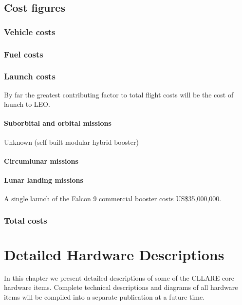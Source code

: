 \documentclass{report}
\begin{document}
\section{Cost figures}

\subsection{Vehicle costs}

\subsection{Fuel costs}

\subsection{Launch costs}

By far the greatest contributing factor to total flight costs will be the cost of launch to LEO. 

\subsubsection{Suborbital and orbital missions}

Unknown (self-built modular hybrid booster)

\subsubsection{Circumlunar missions}

\subsubsection{Lunar landing missions}

A single launch of the Falcon 9 commercial booster costs US\$35,000,000.

\subsection{Total costs}


\chapter{Detailed Hardware Descriptions} \label{chap:detail}

In this chapter we present detailed descriptions of some of the CLLARE core hardware items.  Complete technical descriptions and diagrams of all hardware items will be compiled into a separate publication at a future time.
\end{document}
